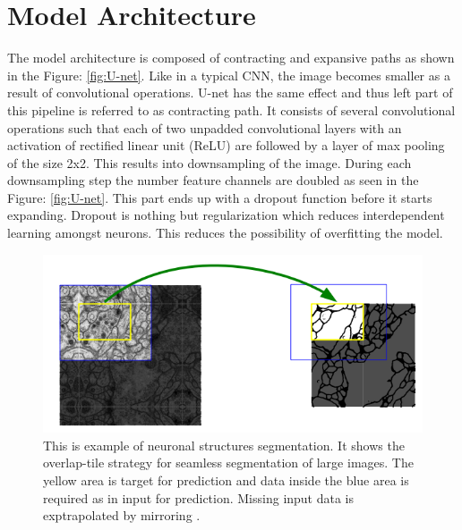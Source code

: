 \documentclass[11pt]{article}
\begin{document}

\section{Model Architecture}
The model architecture is composed of contracting and expansive paths as shown in the Figure: \ref{fig:U-net}. Like in a typical CNN, the image becomes smaller as a result of convolutional operations. U-net has the same effect and thus left part of this pipeline is referred to as contracting path. It consists of several convolutional operations such that each of two unpadded convolutional layers with an activation of rectified linear unit (ReLU) are followed by a layer of max pooling of the size 2x2. This results into downsampling of the image. During each downsampling step the number feature channels are doubled as seen in the Figure: \ref{fig:U-net}. This part ends up with a dropout function before it starts expanding. Dropout is nothing but regularization which reduces interdependent learning amongst neurons. This reduces the possibility of overfitting the model.

\begin{figure}[H]
	\centering
	\includegraphics[width=.6\linewidth]{files/unet/tile.png}
	\caption{This is example of neuronal structures segmentation. It shows the overlap-tile strategy for seamless segmentation of large images. The yellow area is target for prediction and data inside the blue area is required as in input for prediction. Missing input data is exptrapolated by mirroring \cite{ronneberger2015u}.}
	\label{fig:tiling}
\end{figure} 
\end{document}
